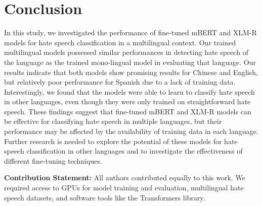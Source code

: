 \documentclass[11pt]{article}
\begin{document}
\section{Conclusion}
In this study, we investigated the performance of fine-tuned mBERT and XLM-R models for hate speech classification in a multilingual context. Our trained multilingual models possessed similar performances in detecting hate speech of the language as the trained mono-lingual model in evaluating that language. Our results indicate that both models show promising results for Chinese and English, but relatively poor performance for Spanish due to a lack of training data. Interestingly, we found that the models were able to learn to classify hate speech in other languages, even though they were only trained on straightforward hate speech. These findings suggest that fine-tuned mBERT and XLM-R models can be effective for classifying hate speech in multiple languages, but their performance may be affected by the availability of training data in each language. Further research is needed to explore the potential of these models for hate speech classification in other languages and to investigate the effectiveness of different fine-tuning techniques.

\vspace{12pt}
\noindent\textbf{Contribution Statement:} All authors contributed equally to this work. We required access to GPUs for model training and evaluation, multilingual hate speech datasets, and software tools like the Transformers library.



\nocite{*}
\end{document}
